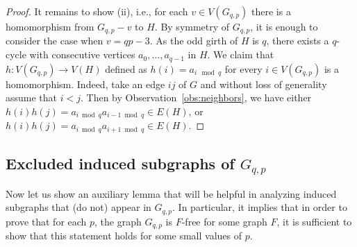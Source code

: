 \documentclass[11pt,a4paper]{article}
\theoremstyle{mystyle}
\begin{document}
\begin{proof}
    It remains to show (ii), i.e., for each $v \in V(G_{q,p})$ there is a homomorphism from $G_{q,p} - v$ to $H$.
    By symmetry of $G_{q,p}$, it is enough to consider the case when $v=qp-3$.
    As the odd girth of $H$ is $q$, there exists a $q$-cycle with consecutive vertices $a_0,\ldots,a_{q-1}$ in $H$.
    We claim that $h:V(G_{q,p}) \to V(H)$ defined as $h(i)=a_{i \mod q}$ for every $i \in V(G_{q,p})$ is a homomorphism.
    Indeed, take an edge $ij$ of $G$ and without loss of generality assume that $i<j$.
    Then by Observation~\ref{obs:neighbors}, we have either $h(i)h(j)=a_{i\bmod q}a_{i-1 \bmod q} \in E(H)$,
    or $h(i)h(j)=a_{i\bmod q}a_{i+1 \bmod q} \in E(H)$.
\end{proof}

\subsection{Excluded induced subgraphs of $G_{q,p}$}

Now let us show an auxiliary lemma that will be helpful in analyzing induced subgraphs that (do not) appear in $G_{q,p}$.
In particular, it implies that in order to prove that for each $p$, the graph $G_{q,p}$ is $F$-free for some graph $F$,
it is sufficient to show that this statement holds for some small values of $p$.
\end{document}
